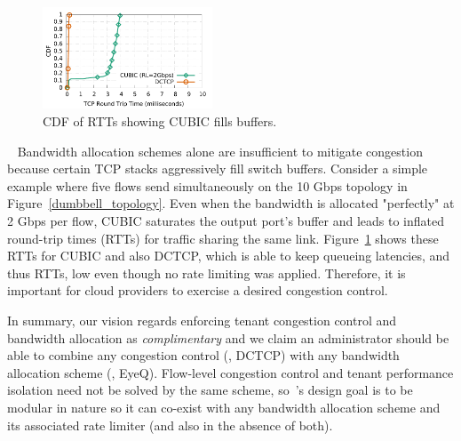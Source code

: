

\begin{figure}[!t]
        \centering
  \includegraphics[width=0.45\textwidth]{figures/motivation/motivation_2Gbps_cubic_rl_dctcp_sockperf.pdf}
        \caption{CDF of RTTs showing CUBIC fills buffers.}
        \label{cubic-fill}
\end{figure}
~
Bandwidth allocation schemes alone are insufficient to mitigate congestion because certain TCP stacks aggressively
fill switch buffers. Consider a simple example where five flows send simultaneously
on the 10 Gbps topology in Figure~\ref{dumbbell_topology}. Even when the bandwidth is allocated "perfectly"
at 2 Gbps per flow, CUBIC saturates the output port's buffer and leads to inflated round-trip times (RTTs) for traffic
sharing the same link.
Figure~\ref{cubic-fill} shows these RTTs for CUBIC and also DCTCP, 
which is able to keep queueing latencies, and thus RTTs, low even though no rate limiting was applied.
Therefore, it is important for cloud providers to exercise a desired congestion
control.

In summary, our vision regards enforcing tenant congestion control and bandwidth allocation as {\em complimentary} and we claim 
an administrator should be able to
combine any congestion control (\eg{}, DCTCP) with any bandwidth allocation scheme (\eg{}, EyeQ). 
Flow-level congestion control and tenant performance isolation need not be solved by the same scheme,
so~\acdc{}'s design goal is to be modular in nature so it can co-exist with any bandwidth allocation scheme
and its associated rate limiter (and also in the absence of both). 

